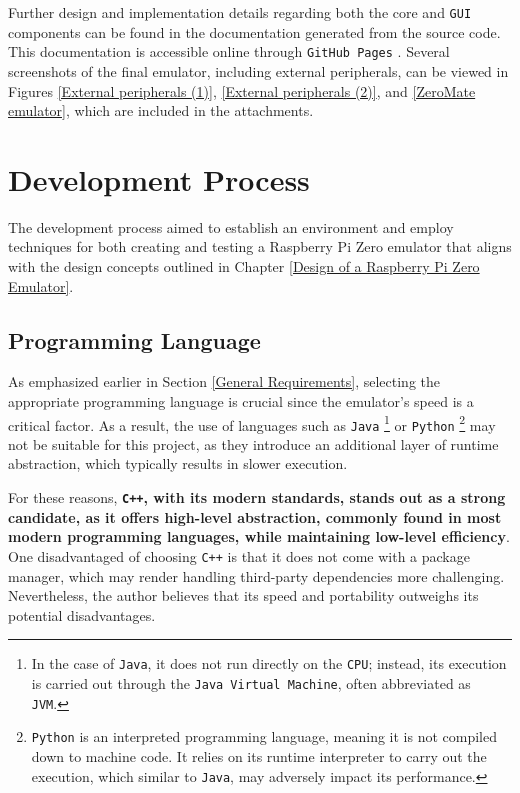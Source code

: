\documentclass[english, ing, kiv, he, iso690numb, pdf]{fasthesis}
\begin{document}
	\newpage
	
	\begin{important}
		Further design and implementation details regarding both the core and \texttt{GUI} components can be found in the documentation generated from the source code. This documentation is accessible online through \texttt{GitHub Pages} \cite{ZeroMate-docs}. Several screenshots of the final emulator, including external peripherals, can be viewed in Figures \ref{External peripherals (1)}, \ref{External peripherals (2)}, and \ref{ZeroMate emulator}, which are included in the attachments.
	\end{important}
	
	\chapter{Development Process}
	
	The development process aimed to establish an environment and employ techniques for both creating and testing a Raspberry Pi Zero emulator that aligns with the design concepts outlined in Chapter \ref{Design of a Raspberry Pi Zero Emulator}.
	
	\section{Programming Language} \label{Programming Language}
	
	As emphasized earlier in Section \ref{General Requirements}, selecting the appropriate programming language is crucial since the emulator's speed is a critical factor. As a result, the use of languages such as \texttt{Java} \footnote{In the case of \texttt{Java}, it does not run directly on the \texttt{CPU}; instead, its execution is carried out through the \texttt{Java Virtual Machine}, often abbreviated as \texttt{JVM}.} or \texttt{Python} \footnote{\texttt{Python} is an interpreted programming language, meaning it is not compiled down to machine code. It relies on its runtime interpreter to carry out the execution, which similar to \texttt{Java}, may adversely impact its performance.} may not be suitable for this project, as they introduce an additional layer of runtime abstraction, which typically results in slower execution.
	
	For these reasons, \textbf{\texttt{C++}, with its modern standards, stands out as a strong candidate, as it offers high-level abstraction, commonly found in most modern programming languages, while maintaining low-level efficiency}. One disadvantaged of choosing \texttt{C++} is that it does not come with a package manager, which may render handling third-party dependencies more challenging. Nevertheless, the author believes that its speed and portability outweighs its potential disadvantages.
	
\end{document}
